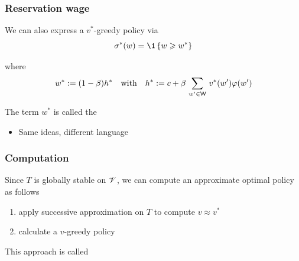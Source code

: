 \begin{frame}
    \frametitle{Reservation wage}
    

            \vspace{0.5em}
    We can also express a $v^*$-greedy policy via
    \begin{equation*}
        \sigma^*(w) 
        = \1
        \left\{
            w \geq w^*
        \right\}
    \end{equation*}

    where
    \begin{equation*}
        w^* := (1 - \beta) h^* 
        \quad \text{with} \quad
        h^* 
        := c + \beta \, \sum_{w' \in \mathsf W} \, v^*(w') \varphi(w') 
    \end{equation*}

            \vspace{0.5em}
            \vspace{0.5em}
    The term $w^*$ is called the 

    \begin{itemize}
        \item Same ideas, different language
    \end{itemize}

\end{frame}

\begin{frame}
    \frametitle{Computation}

    Since $T$ is globally stable on $\mathscr V$, we can compute an approximate
    optimal policy as follows

            \vspace{0.5em}
    \begin{enumerate}
        \item apply successive approximation on $T$ to compute $v \approx v^*$
            \vspace{0.5em}
        \item calculate a $v$-greedy policy
    \end{enumerate}

            \vspace{0.5em}
            \vspace{0.5em}
            \vspace{0.5em}
    This approach is called 

\end{frame}



